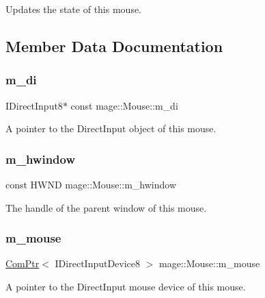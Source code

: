 Updates the state of this mouse. 

\subsection{Member Data Documentation}
\hypertarget{classmage_1_1_mouse_a892a9e1d5ad16ac9b67a5f69fbfedeab}{}\label{classmage_1_1_mouse_a892a9e1d5ad16ac9b67a5f69fbfedeab} 
\subsubsection{\texorpdfstring{m\+\_\+di}{m\_di}}
{\footnotesize\ttfamily I\+Direct\+Input8$\ast$ const mage\+::\+Mouse\+::m\+\_\+di\hspace{0.3cm}{\ttfamily [private]}}

A pointer to the Direct\+Input object of this mouse. \hypertarget{classmage_1_1_mouse_a51592b367595f8ed772266104fc813c5}{}\label{classmage_1_1_mouse_a51592b367595f8ed772266104fc813c5} 
\subsubsection{\texorpdfstring{m\+\_\+hwindow}{m\_hwindow}}
{\footnotesize\ttfamily const H\+W\+ND mage\+::\+Mouse\+::m\+\_\+hwindow\hspace{0.3cm}{\ttfamily [private]}}

The handle of the parent window of this mouse. \hypertarget{classmage_1_1_mouse_a3f2803f3c0e008f5d764a11de3dbe098}{}\label{classmage_1_1_mouse_a3f2803f3c0e008f5d764a11de3dbe098} 
\subsubsection{\texorpdfstring{m\+\_\+mouse}{m\_mouse}}
{\footnotesize\ttfamily \hyperlink{namespacemage_ae74f374780900893caa5555d1031fd79}{Com\+Ptr}$<$ I\+Direct\+Input\+Device8 $>$ mage\+::\+Mouse\+::m\+\_\+mouse\hspace{0.3cm}{\ttfamily [private]}}

A pointer to the Direct\+Input mouse device of this mouse. \hypertarget{classmage_1_1_mouse_ac10dd127b4289731e0058f9588259c28}{}\label{classmage_1_1_mouse_ac10dd127b4289731e0058f9588259c28} 
